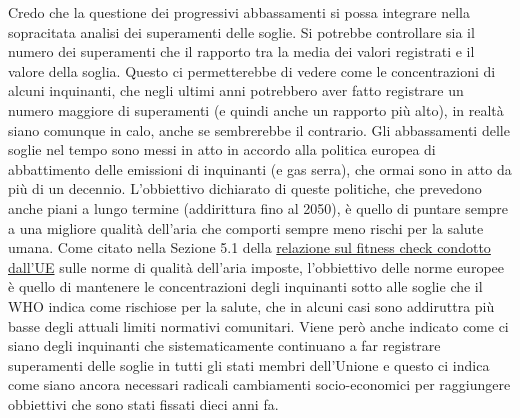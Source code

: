 \documentclass{article}
\begin{document}
Credo che la questione dei progressivi abbassamenti si possa integrare nella sopracitata analisi dei superamenti delle soglie. Si potrebbe controllare sia il numero dei superamenti che il rapporto tra la media dei valori registrati e il valore della soglia. Questo ci permetterebbe di vedere come le concentrazioni di alcuni inquinanti, che negli ultimi anni potrebbero aver fatto registrare un numero maggiore di superamenti (e quindi anche un rapporto più alto), in realtà siano comunque in calo, anche se sembrerebbe il contrario. Gli abbassamenti delle soglie nel tempo sono messi in atto in accordo alla politica europea di abbattimento delle emissioni di inquinanti (e gas serra), che ormai sono in atto da più di un decennio. L'obbiettivo dichiarato di queste politiche, che prevedono anche piani a lungo termine (addirittura fino al 2050), è quello di puntare sempre a una migliore qualità dell'aria che comporti sempre meno rischi per la salute umana.
Come citato nella Sezione 5.1 della \href{https://ec.europa.eu/environment/air/pdf/SWD_2019_427_F1_AAQ%20Fitness%20Check.pdf}{relazione sul fitness check condotto dall'UE} sulle norme di qualità dell'aria imposte, l'obbiettivo delle norme europee è quello di mantenere le concentrazioni degli inquinanti sotto alle soglie che il WHO indica come rischiose per la salute, che in alcuni casi sono addiruttra più basse degli attuali limiti normativi comunitari. Viene però anche indicato come ci siano degli inquinanti che sistematicamente continuano a far registrare superamenti delle soglie in tutti gli stati membri dell'Unione e questo ci indica come siano ancora necessari radicali cambiamenti socio-economici per raggiungere obbiettivi che sono stati fissati dieci anni fa.
\end{document}
